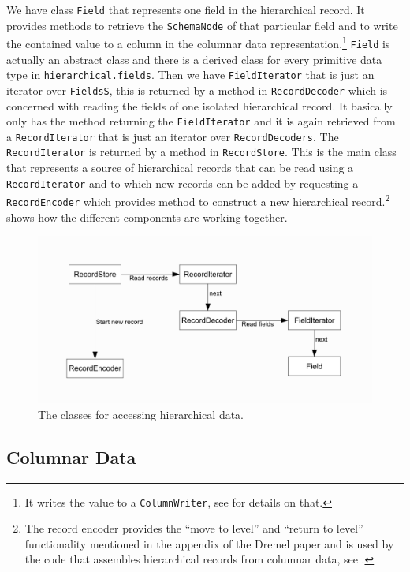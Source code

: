 We have class \texttt{Field} that represents one field in the hierarchical
record. It provides methods to retrieve the \texttt{SchemaNode} of that
particular field and to write the contained value to a column in
the columnar data representation.\footnote{It writes the value to a
\texttt{ColumnWriter}, see  for details on that.} \texttt{Field}
is actually an abstract class and there is a derived class for every
primitive data type in \texttt{hierarchical.fields}.
Then we have \texttt{FieldIterator} that is just an iterator over
\texttt{FieldsS}, this is returned by a method in \texttt{RecordDecoder}
which is concerned with reading the fields of one isolated hierarchical record.
It basically only has the method returning the \texttt{FieldIterator}
and it is again retrieved from a \texttt{RecordIterator} that is just
an iterator over \texttt{RecordDecoders}. The \texttt{RecordIterator}
is returned by a method in \texttt{RecordStore}. This is the main class
that represents a source of hierarchical records that can be read using
a \texttt{RecordIterator} and to which new records can be added by requesting
a \texttt{RecordEncoder} which provides method to construct a new hierarchical
record.\footnote{The record encoder provides the ``move to level'' and
``return to level'' functionality mentioned in the appendix of the Dremel
paper \cite{melnik2010dremel} and is used by the code that assembles
hierarchical records from columnar data, see .}
 shows how the different components are working together.

\begin{figure}[ht]
  \centering
  \includegraphics[width=.8\textwidth]{images/hierarchical}
  \caption{The classes for accessing hierarchical data.}
  \label{fig:hierarchical}
\end{figure}

\subsection{Columnar Data}
\label{sec:columnar}

